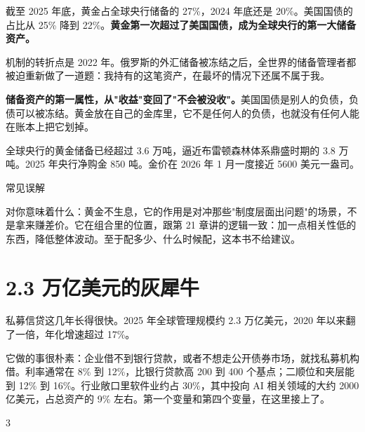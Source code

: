 截至 2025 年底，黄金占全球央行储备的 27\%，2024 年底还是 20\%。美国国债的占比从 25\% 降到 22\%。\textbf{黄金第一次超过了美国国债，成为全球央行的第一大储备资产。}

\begin{barfig}
\end{barfig}

机制的转折点是 2022 年。俄罗斯的外汇储备被冻结之后，全世界的储备管理者都被迫重新做了一道题：我持有的这笔资产，在最坏的情况下还属不属于我。

\textbf{储备资产的第一属性，从"收益"变回了"不会被没收"。}美国国债是别人的负债，负债可以被冻结。黄金放在自己的金库里，它不是任何人的负债，也就没有任何人能在账本上把它划掉。

全球央行的黄金储备已经超过 3.6 万吨，逼近布雷顿森林体系鼎盛时期的 3.8 万吨。2025 年央行净购金 850 吨。金价在 2026 年 1 月一度接近 5600 美元一盎司。

\begin{mythbox}{常见误解}
\end{mythbox}

对你意味着什么：黄金不生息，它的作用是对冲那些"制度层面出问题"的场景，不是拿来赚差价。它在组合里的位置，跟第 21 章讲的逻辑一致：加一点相关性低的东西，降低整体波动。至于配多少、什么时候配，这本书不给建议。

\section{2.3 万亿美元的灰犀牛}

私募信贷这几年长得很快。2025 年全球管理规模约 2.3 万亿美元，2020 年以来翻了一倍，年化增速超过 17\%。

它做的事很朴素：企业借不到银行贷款，或者不想走公开债券市场，就找私募机构借。利率通常在 8\% 到 12\%，比银行贷款高 200 到 400 个基点；二顺位和夹层能到 12\% 到 16\%。行业敞口里软件业约占 30\%，其中投向 AI 相关领域的大约 2000 亿美元，占总资产的 9\% 左右。第一个变量和第四个变量，在这里接上了。

\begin{statrow}{3}
\end{statrow}

